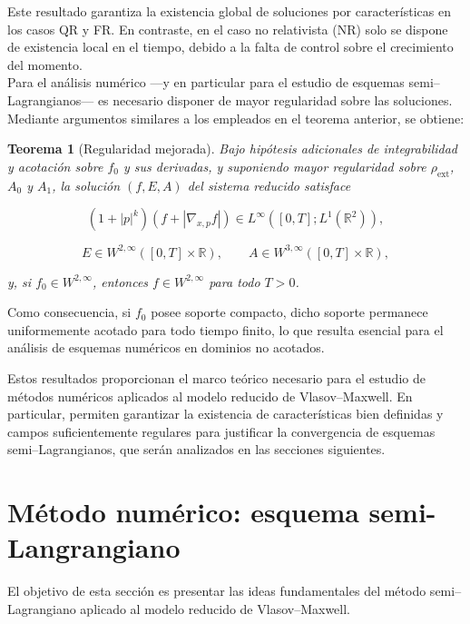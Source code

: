 \documentclass[11pt,a4paper,twoside,pdf]{article}
\numberwithin{equation}{section}
\newtheorem{theorem}{Teorema}[section]
\begin{document}
Este resultado garantiza la existencia global de soluciones por características en los
casos QR y FR. En contraste, en el caso no relativista (NR) solo se dispone de
existencia local en el tiempo, debido a la falta de control sobre el crecimiento del
momento.\\

Para el análisis numérico —y en particular para el estudio de esquemas
semi--Lagrangianos— es necesario disponer de mayor regularidad sobre las soluciones.
Mediante argumentos similares a los empleados en el teorema anterior, se obtiene:

\begin{theorem}[Regularidad mejorada]
Bajo hipótesis adicionales de integrabilidad y acotación sobre $f_0$ y sus derivadas,
y suponiendo mayor regularidad sobre $\rho_{\mathrm{ext}}$, $A_0$ y $A_1$, la solución
$(f,E,A)$ del sistema reducido satisface


\[
(1+|p|^k)(f + |\nabla_{x,p} f|) \in L^\infty([0,T];L^1(\mathbb{R}^2)),
\]




\[
E\in W^{2,\infty}([0,T]\times\mathbb{R}), \qquad
A\in W^{3,\infty}([0,T]\times\mathbb{R}),
\]


y, si $f_0\in W^{2,\infty}$, entonces $f\in W^{2,\infty}$ para todo $T>0$.
\end{theorem}

Como consecuencia, si $f_0$ posee soporte compacto, dicho soporte permanece
uniformemente acotado para todo tiempo finito, lo que resulta esencial para el análisis
de esquemas numéricos en dominios no acotados.

\medskip

Estos resultados proporcionan el marco teórico necesario para el estudio de métodos
numéricos aplicados al modelo reducido de Vlasov--Maxwell. En particular, permiten
garantizar la existencia de características bien definidas y campos suficientemente
regulares para justificar la convergencia de esquemas semi--Lagrangianos, que serán
analizados en las secciones siguientes.





\section{Método numérico: esquema semi-Langrangiano}

El objetivo de esta sección es presentar las ideas fundamentales del método
semi–Lagrangiano aplicado al modelo reducido de Vlasov–Maxwell.
\end{document}

